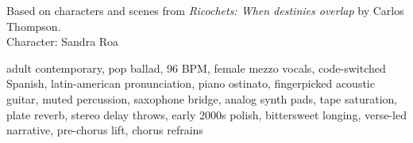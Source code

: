 
\begin{notes}
Based on characters and scenes from \emph{Ricochets: When destinies overlap} by Carlos Thompson.\\
Character: Sandra Roa
\end{notes}
\begin{style}
adult contemporary, pop ballad, 96 BPM, female mezzo vocals, code-switched Spanish, latin-american pronunciation, piano ostinato, fingerpicked acoustic guitar, muted percussion, saxophone bridge, analog synth pads, tape saturation, plate reverb, stereo delay throws, early 2000s polish, bittersweet longing, verse-led narrative, pre-chorus lift, chorus refrains
\end{style}
